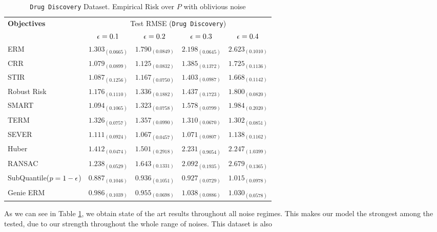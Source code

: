 \documentclass{article} %
\newcommand{\subhead}[1]{\multicolumn{1}{c}{#1}}%
\begin{document}
	\begin{table}[!h]
		\centering
		\begin{tabular}{lcccc}
			\toprule 
			\textbf{Objectives}&\multicolumn{4}{c}{Test RMSE (\texttt{Drug Discovery})}\\                   
			\cmidrule(rl){2-5}
			&\subhead{${\epsilon} = 0.1$}& \subhead{${\epsilon} = 0.2$}& \subhead{${\epsilon} = 0.3$}& \subhead{${\epsilon} = 0.4$}\\ 
			\midrule
			ERM  &$1.303_{(0.0665)}$&$1.790_{(0.0849)}$&$2.198_{(0.0645)}$&$2.623_{(0.1010)}$\\
			CRR \cite{bhatia2017}  &$\mathbf{1.079_{(0.0899)}}$&$1.125_{(0.0832)}$&$1.385_{(0.1372)}$&$1.725_{(0.1136)}$\\
			STIR \cite{pmlr-v89-mukhoty19a} &$1.087_{(0.1256)}$&$1.167_{(0.0750)}$&$1.403_{(0.0987)}$&$1.668_{(0.1142)}$\\
			Robust Risk \cite{RRM} &$1.176_{(0.1110)}
			$&$1.336_{(0.1882)}$&$1.437_{(0.1723)}$&$1.800_{(0.0820)}$\\
			SMART \cite{https://doi.org/10.48550/arxiv.2206.04777} &$1.094_{(0.1065)}$&$1.323_{(0.0758)}$&$1.578_{(0.0799)}$&$1.984_{(0.2020)}$\\
			TERM \cite{li2020tilted} &$1.326_{(0.0757)}$&$1.357_{(0.0990)}$&$1.310_{(0.0670)}$&$1.302_{(0.0851)}$\\
			SEVER \cite{DiakonikolasKKLSS19} &$1.111_{(0.0924)}$&$\mathbf{1.067_{(0.0457)}}$&$\mathbf{1.071_{(0.0807)}}$&$\mathbf{1.138_{(0.1162)}}$\\
			Huber \cite{Huber2009} &$1.412_{(0.0474)}$&$1.501_{(0.2918)}$&$2.231_{(0.9054)}$&$2.247_{(1.0399)}$\\
			RANSAC \cite{RANSAC1981} &$1.238_{(0.0529)}$&$1.643_{(0.1331)}$&$2.092_{(0.1935)}$&$2.679_{(0.1365)}$\\
			\rowcolor{LightCyan}
			SubQuantile($p = 1-{\epsilon}$) &$\mathbf{0.887_{(0.1046)}}$&$\mathbf{0.936_{(0.1051)}}$&$\mathbf{0.927_{(0.0729)}}$&$\mathbf{1.015_{(0.0978)}}$\\
			\midrule 
			Genie ERM &$0.986_{(0.1039)}$&$0.955_{(0.0698)}$&$1.038_{(0.0886)}$&$1.030_{(0.0578)}$\\
			\bottomrule
		\end{tabular}
		\caption{\texttt{Drug Discovery} Dataset. Empirical Risk over $P$ with oblivious noise}
		\label{tab:drug-discovery}
	\end{table}
	
	As we can see in Table \ref{tab:drug-discovery}, we obtain state of the art results throughout all noise regimes. This makes our model the strongest among the tested, due to our strength throughout the whole range of noises. This dataset is also 
	
\end{document}
